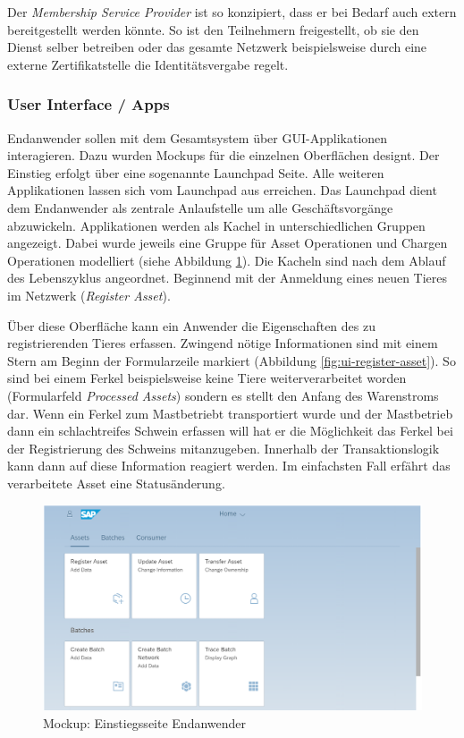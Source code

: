 Der \textit{Membership Service Provider} ist so konzipiert, dass er bei Bedarf auch extern bereitgestellt werden könnte. So ist den Teilnehmern freigestellt, ob sie den Dienst selber betreiben oder das gesamte Netzwerk beispielsweise durch eine externe Zertifikatstelle die Identitätsvergabe regelt.

\subsubsection{User Interface / \DH Apps}
Endanwender sollen mit dem Gesamtsystem über GUI-Applikationen interagieren. Dazu wurden Mockups für die einzelnen Oberflächen designt. Der Einstieg erfolgt über eine sogenannte Launchpad Seite. Alle weiteren Applikationen lassen sich vom Launchpad aus erreichen. Das Launchpad dient dem Endanwender als zentrale Anlaufstelle um alle Geschäftsvorgänge abzuwickeln. Applikationen werden als Kachel in unterschiedlichen Gruppen angezeigt. Dabei wurde jeweils eine Gruppe für Asset Operationen und Chargen Operationen modelliert (siehe Abbildung \ref{fig:ui-launchpad}). Die Kacheln sind nach dem Ablauf des Lebenszyklus angeordnet. Beginnend mit der Anmeldung eines neuen Tieres im Netzwerk (\textit{Register Asset}).

Über diese Oberfläche kann ein Anwender die Eigenschaften des zu registrierenden Tieres erfassen. Zwingend nötige Informationen sind mit einem Stern am Beginn der Formularzeile markiert (Abbildung \ref{fig:ui-register-asset}). So sind bei einem Ferkel beispielsweise keine Tiere weiterverarbeitet worden (Formularfeld \textit{Processed Assets}) sondern es stellt den Anfang des Warenstroms dar. Wenn ein Ferkel zum Mastbetriebt transportiert wurde und der Mastbetrieb dann ein schlachtreifes Schwein erfassen will hat er die Möglichkeit das Ferkel bei der Registrierung des Schweins mitanzugeben. Innerhalb der Transaktionslogik kann dann auf diese Information reagiert werden. Im einfachsten Fall erfährt das verarbeitete Asset eine Statusänderung.

\begin{figure}[H]
	\centering
	\includegraphics[width=1\linewidth]{pictures/ui-launchpad}
	\caption[Mockup: Einstiegsseite Endanwender]{Mockup: Einstiegsseite Endanwender}
	\label{fig:ui-launchpad}
\end{figure}

